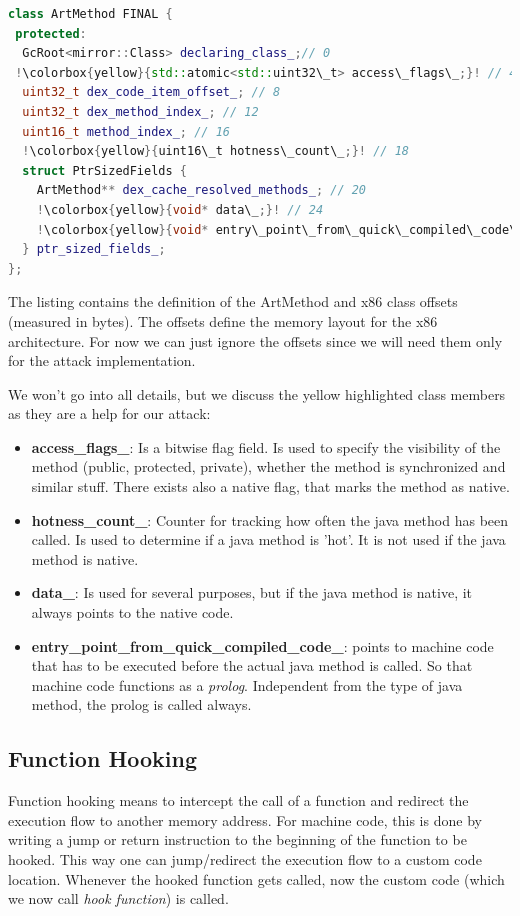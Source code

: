 \begin{lstlisting}[language=C++, style=CppCodeStyle, caption=ArtMethod and x86 offsets \cite{ArtMethodOreoRev36}, label=ArtMethodLabel,
escapechar=!]
class ArtMethod FINAL { 
 protected:
  GcRoot<mirror::Class> declaring_class_;// 0
 !\colorbox{yellow}{std::atomic<std::uint32\_t> access\_flags\_;}! // 4
  uint32_t dex_code_item_offset_; // 8
  uint32_t dex_method_index_; // 12
  uint16_t method_index_; // 16
  !\colorbox{yellow}{uint16\_t hotness\_count\_;}! // 18
  struct PtrSizedFields {
    ArtMethod** dex_cache_resolved_methods_; // 20
    !\colorbox{yellow}{void* data\_;}! // 24
    !\colorbox{yellow}{void* entry\_point\_from\_quick\_compiled\_code\_;}! // 28
  } ptr_sized_fields_;
};
\end{lstlisting}

The listing contains the definition of the ArtMethod and x86 class offsets (measured in bytes). The offsets define the memory layout for the x86 architecture. For now we can just ignore the offsets since we will need them only for the attack implementation.

We won't go into all details, but we discuss the yellow highlighted class members as they are a help for our attack:

\begin{itemize}
\item \textbf{access\_flags\_}: Is a bitwise flag field. Is used to specify the visibility of the method (public, protected, private), whether the method is synchronized and similar stuff. There exists also a native flag, that marks the method as native.
\item \textbf{hotness\_count\_}: Counter for tracking how often the java method has been called. Is used to determine if a java method is 'hot'. It is not used if the java method is native.
\item \textbf{data\_}: Is used for several purposes, but if the java method is native, it always points to the native code.
\item \textbf{entry\_point\_from\_quick\_compiled\_code\_}: points to machine code that has to be executed before the actual java method is called. So that machine code functions as a \emph{prolog}. Independent from the type of java method, the prolog is called always.
\end{itemize}

\subsection{Function Hooking}
Function hooking means to intercept the call of a function and redirect the execution flow to another memory address.
For machine code, this is done by writing a jump or return instruction to the beginning of the function to be hooked. This way one can jump/redirect the execution flow to a custom code location. 
Whenever the hooked function gets called, now the custom code (which we now call \emph{hook function}) is called.

